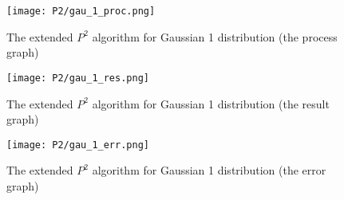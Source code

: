\begin{figure}[h!]
	\texttt{[image: P2/gau\_1\_proc.png]}
    \caption{The extended $P^2$ algorithm for Gaussian 1 distribution (the process graph)}
    \label{fig: p2_proc}
\end{figure}

\begin{figure}[h!]
	\texttt{[image: P2/gau\_1\_res.png]}
	\caption{The extended $P^2$ algorithm for Gaussian 1 distribution (the result graph)}
    \label{fig: p2_res}
\end{figure}

\begin{figure}[h!]
	\texttt{[image: P2/gau\_1\_err.png]}
    \caption{The extended $P^2$ algorithm for Gaussian 1 distribution (the error graph)}
    \label{fig: p2_err}
\end{figure}

\newpage
